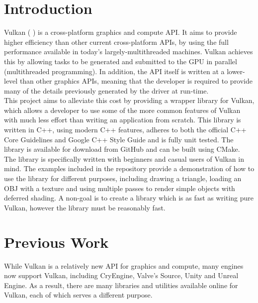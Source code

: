 \documentclass[12pt]{report}
\newcommand{\citesoftware}[1]{(\citeauthor{#1} \citeyear{#1})}
\theoremstyle{definition}
\begin{document}
  \tableofcontents

  \listoffigures

  \chapter{Introduction}
    Vulkan \citesoftware{vulkan} is a cross-platform graphics and compute API.
    It aims to provide higher efficiency than other current
    cross-platform APIs, by using the full performance available in today's
    largely-multithreaded machines. Vulkan achieves this by allowing tasks to be
    generated and submitted to the GPU in parallel (multithreaded programming).
    In addition, the API itself is written at a lower-level than other graphics
    APIs, meaning that the developer is required to provide many of the details
    previously generated by the driver at run-time.\\

    This project aims to alleviate this cost by providing a wrapper library for
    Vulkan, which allows a developer to use some of the more common features of
    Vulkan with much less effort than writing an application from scratch. This
    library is written in C++, using modern C++ features, adheres to both the
    official C++ Core Guidelines and Google C++ Style Guide and is fully unit
    tested. The library is available for download from GitHub and can be built
    using CMake.\\

    The library is specifically written with beginners and casual users of
    Vulkan in mind. The examples included in the repository provide a
    demonstration of how to use the library for different purposes, including
    drawing a triangle, loading an OBJ with a texture and using multiple passes
    to render simple objects with deferred shading. A non-goal is to create a
    library which is as fast as writing pure Vulkan, however the library
    must be reasonably fast.\\

  \chapter{Previous Work}

    While Vulkan is a relatively new API for graphics and compute, many engines
    now support Vulkan, including CryEngine, Valve's Source, Unity and Unreal
    Engine. As a result, there are many libraries and utilities available
    online for Vulkan, each of which serves a different purpose.
\end{document}
